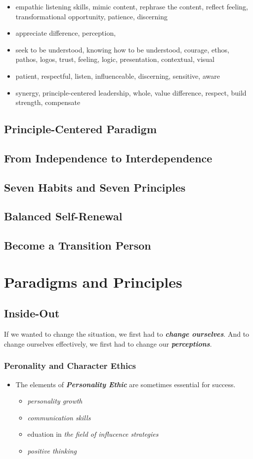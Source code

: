 \documentclass[11pt]{article}
\begin{document}
\begin{itemize}
\item empathic listening skills, mimic content, rephrase the content, reflect feeling, transformational opportunity, patience, discerning
\item appreciate difference, perception, 
\item seek to be understood, knowing how to be understood, courage, ethos, pathos, logos, trust, feeling, logic, presentation, contextual, visual
\item patient, respectful, listen, influenceable, discerning, sensitive, aware
\item synergy, principle-centered leadership, whole, value difference, respect, build strength, compensate
\end{itemize}
\subsection{Principle-Centered Paradigm}
\subsection{From Independence to Interdependence}
\subsection{Seven Habits and Seven Principles}
\subsection{Balanced Self-Renewal}
\subsection{Become a Transition Person}

\section{Paradigms and Principles}
\subsection{Inside-Out}
If we wanted to change the situation, we first had to \emph{\textbf{change ourselves}}. And to change ourselves effectively, we first had to change our \emph{\textbf{perceptions}}.
\subsubsection{Peronality and Character Ethics}
\begin{itemize}
\item The elements of \emph{\textbf{Personality Ethic}} are sometimes essential for success.
\begin{itemize}
\item \emph{personality growth}
\item \emph{communication skills}
\item eduation in \emph{the field of influcence strategies}
\item \emph{positive thinking}
\end{itemize} 
\end{itemize}
\end{document}
